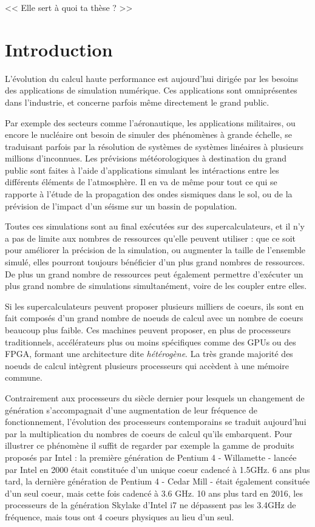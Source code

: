 \begin{savequote}[6cm]
<< Elle sert à quoi ta thèse ?  >>

\end{savequote}
\chapter{Introduction}
\chaptertoc

L'évolution du calcul haute performance est aujourd'hui dirigée par les besoins des applications de simulation numérique.
Ces applications sont omniprésentes dans l'industrie, et concerne parfois même directement le grand public.

Par exemple des secteurs comme l'aéronautique, les applications militaires, ou encore le nucléaire ont besoin de simuler des phénomènes à grande échelle, se traduisant parfois par la résolution de systèmes de systèmes linéaires à plusieurs millions d'inconnues.
Les prévisions météorologiques à destination du grand public sont faites à l'aide d'applications simulant les intéractions entre les différents éléments de l'atmosphère.
Il en va de même pour tout ce qui se rapporte à l'étude de la propagation des ondes sismiques dans le sol, ou de la prévision de l'impact d'un séisme sur un bassin de population.

Toutes ces simulations sont au final exécutées sur des supercalculateurs, et il n'y a pas de limite aux nombres de ressources qu'elle peuvent utiliser : que ce soit pour améliorer la précision de la simulation, ou augmenter la taille de l'ensemble simulé, elles pourront toujours bénéficier d'un plus grand nombres de ressources.
De plus un grand nombre de ressources peut également permettre d'exécuter un plus grand nombre de simulations simultanément, voire de les coupler entre elles.

Si les supercalculateurs peuvent proposer plusieurs milliers de coeurs, ils sont en fait composés d'un grand nombre de noeuds de calcul avec un nombre de coeurs beaucoup plus faible.
Ces machines peuvent proposer, en plus de processeurs traditionnels, accélérateurs plus ou moins spécifiques comme des GPUs ou des FPGA, formant une architecture dite \emph{hétérogène}.
La très grande majorité des noeuds de calcul intègrent plusieurs processeurs qui accèdent à une mémoire commune.

Contrairement aux processeurs du siècle dernier pour lesquels un changement de génération s'accompagnait d'une augmentation de leur fréquence de fonctionnement, l'évolution des processeurs contemporains se traduit aujourd'hui par la multiplication du nombres de coeurs de calcul qu'ils embarquent.
Pour illustrer ce phénomène il suffit de regarder par exemple la gamme de produits proposés par Intel : la première génération de Pentium 4 - Willamette - lancée par Intel en 2000 était constituée d'un unique coeur cadencé à 1.5GHz. 6 ans plus tard, la dernière génération de Pentium 4 - Cedar Mill - était également consituée d'un seul coeur, mais cette fois cadencé à 3.6 GHz. 10 ans plus tard en 2016, les processeurs de la génération Skylake d'Intel i7 ne dépassent pas les 3.4GHz de fréquence, mais tous ont 4 coeurs physiques au lieu d'un seul.

